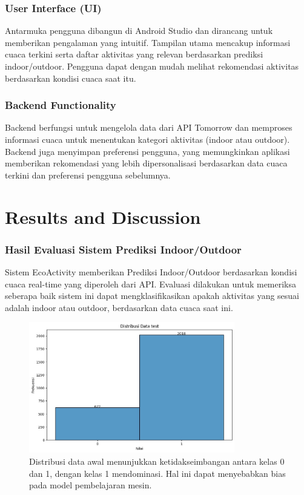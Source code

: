 \documentclass[journal,article,submit,pdftex,moreauthors]{Definitions/mdpi}
\begin{document}
\subsubsection{User Interface (UI)}
Antarmuka pengguna dibangun di Android Studio dan dirancang untuk memberikan pengalaman yang intuitif. Tampilan utama mencakup informasi cuaca terkini serta daftar aktivitas yang relevan berdasarkan prediksi indoor/outdoor. Pengguna dapat dengan mudah melihat rekomendasi aktivitas berdasarkan kondisi cuaca saat itu.

\subsubsection{Backend Functionality}
Backend berfungsi untuk mengelola data dari API Tomorrow dan memproses informasi cuaca untuk menentukan kategori aktivitas (indoor atau outdoor). Backend juga menyimpan preferensi pengguna, yang memungkinkan aplikasi memberikan rekomendasi yang lebih dipersonalisasi berdasarkan data cuaca terkini dan preferensi pengguna sebelumnya.
\section{Results and Discussion}

\subsubsection{Hasil Evaluasi Sistem Prediksi Indoor/Outdoor}

Sistem EcoActivity memberikan Prediksi Indoor/Outdoor berdasarkan kondisi cuaca real-time yang diperoleh dari API. Evaluasi dilakukan untuk memeriksa seberapa baik sistem ini dapat mengklasifikasikan apakah aktivitas yang sesuai adalah indoor atau outdoor, berdasarkan data cuaca saat ini.

\begin{figure}[htbp]
    \centering
    \includegraphics[width=0.8\textwidth]{Definitions/images/1.jpeg}
    \caption{Distribusi data awal menunjukkan ketidakseimbangan antara kelas 0 dan 1, dengan kelas 1 mendominasi. Hal ini dapat menyebabkan bias pada model pembelajaran mesin.}
    \label{fig:distribusi_awal}
\end{figure}
\end{document}
